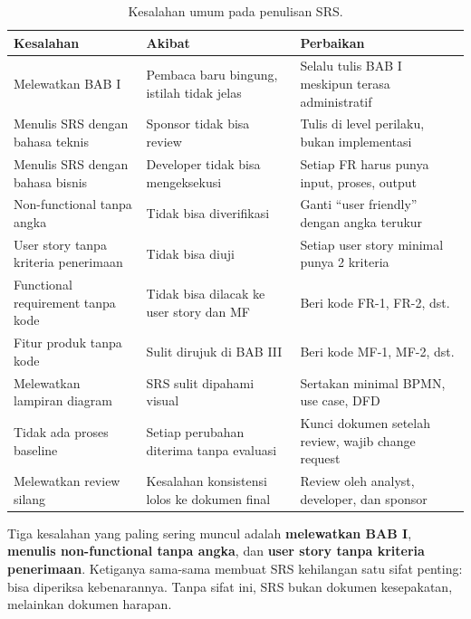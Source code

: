\documentclass[11pt,a4paper]{article}
\begin{document}
\begin{table}[H]
	\centering
	\caption{Kesalahan umum pada penulisan SRS.}
	\label{tab:mistakes}
	\footnotesize
	\begin{tabularx}{\textwidth}{l X X}
		\toprule
		Kesalahan                            & Akibat                                       & Perbaikan                                          \\
		\midrule
		Melewatkan BAB I                     & Pembaca baru bingung, istilah tidak jelas    & Selalu tulis BAB I meskipun terasa administratif   \\
		Menulis SRS dengan bahasa teknis     & Sponsor tidak bisa review                    & Tulis di level perilaku, bukan implementasi        \\
		Menulis SRS dengan bahasa bisnis     & Developer tidak bisa mengeksekusi            & Setiap FR harus punya input, proses, output        \\
		Non-functional tanpa angka           & Tidak bisa diverifikasi                      & Ganti ``user friendly'' dengan angka terukur       \\
		User story tanpa kriteria penerimaan & Tidak bisa diuji                             & Setiap user story minimal punya 2 kriteria         \\
		Functional requirement tanpa kode    & Tidak bisa dilacak ke user story dan MF      & Beri kode FR-1, FR-2, dst.                         \\
		Fitur produk tanpa kode              & Sulit dirujuk di BAB III                     & Beri kode MF-1, MF-2, dst.                         \\
		Melewatkan lampiran diagram          & SRS sulit dipahami visual                    & Sertakan minimal BPMN, use case, DFD               \\
		Tidak ada proses baseline            & Setiap perubahan diterima tanpa evaluasi     & Kunci dokumen setelah review, wajib change request \\
		Melewatkan review silang             & Kesalahan konsistensi lolos ke dokumen final & Review oleh analyst, developer, dan sponsor        \\
		\bottomrule
	\end{tabularx}
\end{table}

Tiga kesalahan yang paling sering muncul adalah \textbf{melewatkan BAB I}, \textbf{menulis non-functional tanpa angka}, dan \textbf{user story tanpa kriteria penerimaan}. Ketiganya sama-sama membuat SRS kehilangan satu sifat penting: bisa diperiksa kebenarannya. Tanpa sifat ini, SRS bukan dokumen kesepakatan, melainkan dokumen harapan.
\end{document}
